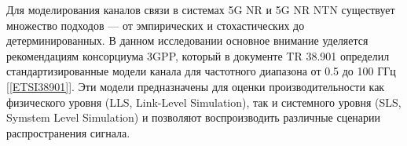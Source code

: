 









%

Для моделирования каналов связи в системах 5G NR и 5G NR NTN существует множество подходов
— от эмпирических и стохастических до детерминированных.
В данном исследовании основное внимание уделяется рекомендациям консорциума 3GPP,
который в документе TR 38.901 определил стандартизированные модели канала для частотного диапазона 
от 0.5 до 100 ГГц [\ref{ETSI38901}]. Эти модели предназначены для оценки производительности как 
физического уровня (LLS, Link-Level Simulation), так и системного уровня (SLS, Symstem Level Simulation)
и позволяют воспроизводить различные сценарии распространения сигнала.


